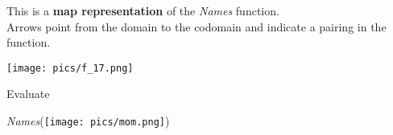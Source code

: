 \documentclass{ximera}
\author{Lee Wayand}
\begin{document}
\begin{exercise}





This is a \textbf{map representation} of the \textit{Names} function. \\

Arrows point from the domain to the codomain and indicate a pairing in the function.

\begin{image}
\texttt{[image: pics/f\_17.png]}
\end{image}















\begin{question}

Evaluate

\begin{center}
\textit{Names}(\texttt{[image: pics/mom.png]})
\end{center}






\begin{multipleChoice}
\end{multipleChoice}

\end{question}



















\end{exercise}
\end{document}
